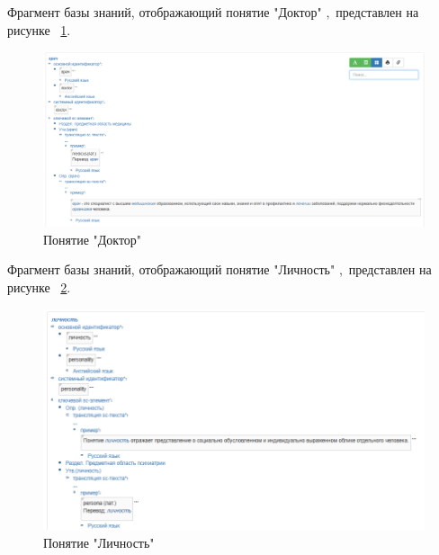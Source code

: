 Фрагмент базы знаний, отображающий  понятие "Доктор" \cite{bme}$,$ представлен на рисунке
~\ref{fig:sections/concept_doctor}.
\begin{figure}[H]
	\centering
	\includegraphics[width=1.0\textwidth]{sections/concept_doctor.png}
	\caption{Понятие "Доктор"}
	\label{fig:sections/concept_doctor}
\end{figure}

Фрагмент базы знаний, отображающий  понятие "Личность" \cite{bme}$,$ представлен на рисунке
~\ref{fig:sections/concept_personality}.
\begin{figure}[H]
	\centering
	\includegraphics[width=1.0\textwidth]{sections/concept_personality.png}
	\caption{Понятие "Личность"}
	\label{fig:sections/concept_personality}
\end{figure}

